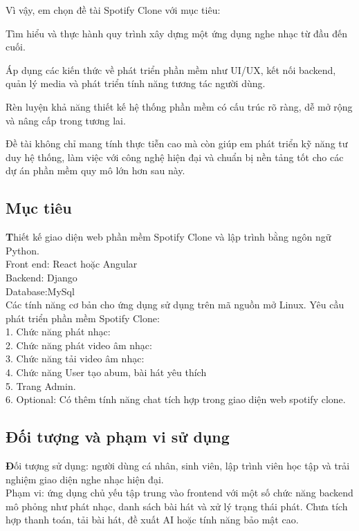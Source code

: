 \documentclass[a4paper]{article}
\begin{document}
Vì vậy, em chọn đề tài Spotify Clone với mục tiêu:

    Tìm hiểu và thực hành quy trình xây dựng một ứng dụng nghe nhạc từ đầu đến cuối.

    Áp dụng các kiến thức về phát triển phần mềm như UI/UX, kết nối backend, quản lý media và phát triển tính năng tương tác người dùng.

    Rèn luyện khả năng thiết kế hệ thống phần mềm có cấu trúc rõ ràng, dễ mở rộng và nâng cấp trong tương lai.

Đề tài không chỉ mang tính thực tiễn cao mà còn giúp em phát triển kỹ năng tư duy hệ thống, làm việc với công nghệ hiện đại và chuẩn bị nền tảng tốt cho các dự án phần mềm quy mô lớn hơn sau này.
    \subsection{Mục tiêu}
    \textbf
    Thiết kế giao diện web phần mềm Spotify Clone và lập trình bằng ngôn ngữ Python.\\
    Front end: React hoặc Angular\\
    Backend: Django\\
    Database:MySql\\
    Các tính năng cơ bản cho ứng dụng sử dụng trên mã nguồn mở Linux.
    Yêu cầu phát triển phần mềm Spotify Clone:\\
    1. Chức năng phát nhạc:\\
    2. Chức năng phát video âm nhạc:\\
    3. Chức năng tải video âm nhạc:\\
    4. Chức năng User tạo abum, bài hát yêu thích\\
    5. Trang Admin.\\
    6. Optional: Có thêm tính năng chat tích hợp trong giao diện web
spotify clone.\\
    \subsection{Đối tượng và phạm vi sử dụng}
    \textbf
    Đối tượng sử dụng: người dùng cá nhân, sinh viên, lập trình viên học tập và trải nghiệm giao diện nghe nhạc hiện đại.\\
    Phạm vi: ứng dụng chủ yếu tập trung vào frontend với một số chức năng backend mô phỏng như phát nhạc, danh sách bài hát và xử lý trạng thái phát. Chưa tích hợp thanh toán, tải bài hát, đề xuất AI hoặc tính năng bảo mật cao.
\end{document}

